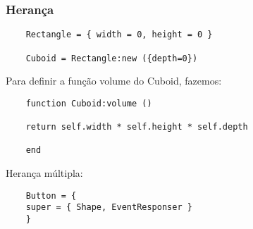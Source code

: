 \begin{frame}[fragile]
  \frametitle{Herança}
  \begin{lstlisting}
    Rectangle = { width = 0, height = 0 }

    Cuboid = Rectangle:new ({depth=0})
  \end{lstlisting}
  \begin{block}{}
   Para definir a função volume do Cuboid, fazemos:
  \end{block}

  \begin{lstlisting}
    function Cuboid:volume ()

    return self.width * self.height * self.depth

    end
  \end{lstlisting}
  \begin{block}{}
	Herança múltipla:
  \end{block}
  \begin{lstlisting}
    Button = {
    super = { Shape, EventResponser }
    }
  \end{lstlisting}
\end{frame}
